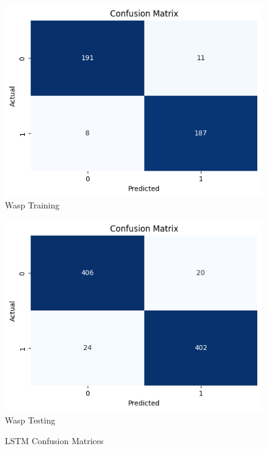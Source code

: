 \documentclass[12pt]{article}
\begin{document}
\begin{enumerate}
		\begin{figure}[H]
			\vspace{1 cm}
			\centering
			\begin{minipage}[H]{0.45\textwidth}
				\centering
				\includegraphics[width=\textwidth]{Images/Confusion/LSTM train.png}\\ \vspace{0.5 cm}
				Wasp Training
			\end{minipage}
			\hfill
			\begin{minipage}[H]{0.45\textwidth}
				\centering
				\includegraphics[width=\textwidth]{Images/Confusion/LSTM test.png}\\ \vspace{0.5 cm}
				Wasp Testing
			\end{minipage}
			\vspace{1.5 cm}
			\caption{LSTM Confusion Matrices}
		\end{figure}
		\newpage
		

\end{enumerate}
\end{document}
